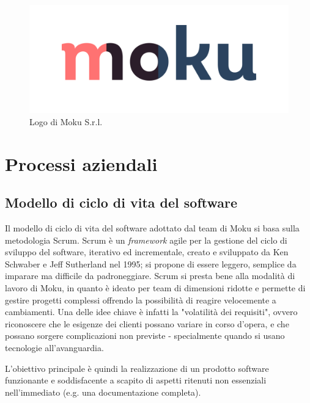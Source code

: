 \begin{figure}[h!]
    \includegraphics[width=\textwidth]{figures/logo_moku.png}
    \caption[Logo Moku]{Logo di Moku S.r.l.
    \label{fig:logomoku}}
\end{figure}    

\section{Processi aziendali}
\subsection{Modello di ciclo di vita del software}
Il modello di ciclo di vita del software adottato dal team di Moku si basa sulla metodologia Scrum. Scrum è un \textit{framework} agile per la gestione del ciclo di sviluppo del software, iterativo ed incrementale, creato e sviluppato da Ken Schwaber e Jeff Sutherland nel 1995; si propone di essere leggero, semplice da imparare ma difficile da padroneggiare. Scrum si presta bene alla modalità di lavoro di Moku, in quanto è ideato per team di dimensioni ridotte e permette di gestire progetti complessi offrendo la possibilità di reagire velocemente a cambiamenti. Una delle idee chiave è infatti la "volatilità dei requisiti", ovvero riconoscere che le esigenze dei clienti possano variare in corso d'opera, e che possano sorgere complicazioni non previste - specialmente quando si usano tecnologie all'avanguardia.

L'obiettivo principale è quindi la realizzazione di un prodotto software funzionante e soddisfacente a scapito di aspetti ritenuti non essenziali nell'immediato (e.g. una documentazione completa).

